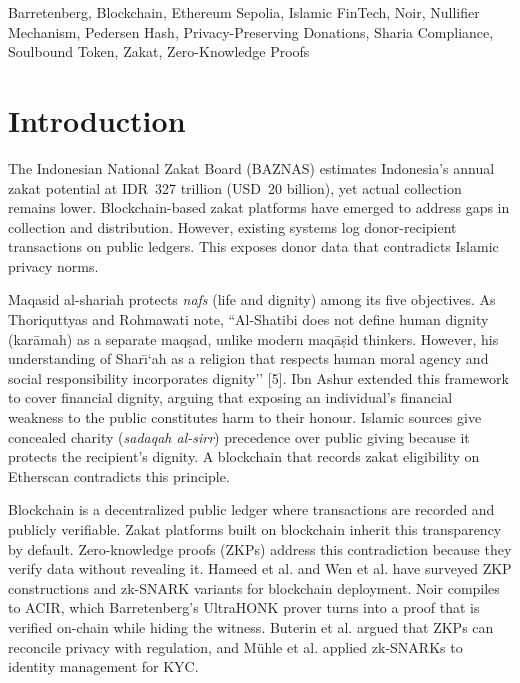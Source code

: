 \documentclass[conference]{IEEEtran}
\begin{document}
\begin{IEEEkeywords}
Barretenberg, Blockchain, Ethereum Sepolia, Islamic FinTech, Noir, Nullifier Mechanism, Pedersen Hash, Privacy-Preserving Donations, Sharia Compliance, Soulbound Token, Zakat, Zero-Knowledge Proofs
\end{IEEEkeywords}

\section{Introduction}

The Indonesian National Zakat Board (BAZNAS)\cite{b_baznas} estimates Indonesia's annual zakat potential at IDR~327 trillion (USD~20 billion), yet actual collection remains lower\cite{b_baznas}\cite{b_zakat_biblio}. Blockchain-based zakat platforms have emerged to address gaps in collection and distribution\cite{b_zakat_acm}\cite{b_zakat_malaysia}\cite{b_zakat_transparency}. However, existing systems log donor-recipient transactions on public ledgers\cite{b_zakat_acm}\cite{b_zakat_transparency}\cite{b_zakat_malaysia}. This exposes donor data that contradicts Islamic privacy norms\cite{b_maqasid_data}\cite{b_maqasid_privacy}.

Maqasid al-shariah protects \textit{nafs} (life and dignity) among its five objectives\cite{b_maqasid_data}\cite{b_maqasid_fintech}. As Thoriquttyas and Rohmawati note, ``Al-Shatibi does not define human dignity (kar\={a}mah) as a separate maq\d{s}ad, unlike modern maq\={a}\d{s}id thinkers. However, his understanding of Shar\={\i}`ah as a religion that respects human moral agency and social responsibility incorporates dignity'' [5]. Ibn Ashur extended this framework to cover financial dignity, arguing that exposing an individual's financial weakness to the public constitutes harm to their honour\cite{b_maqasid_privacy}. Islamic sources give concealed charity (\textit{sadaqah al-sirr}) precedence over public giving because it protects the recipient's dignity\cite{b_maqasid_data}\cite{b_maqasid_privacy}. A blockchain that records zakat eligibility on Etherscan contradicts this principle\cite{b_maqasid_blockchain}.

Blockchain is a decentralized public ledger where transactions are recorded and publicly verifiable\cite{b_zakat_acm}\cite{b_ziswaf_blockchain}. Zakat platforms built on blockchain inherit this transparency by default\cite{b_zakat_transparency}\cite{b_zakat_malaysia}. Zero-knowledge proofs (ZKPs) address this contradiction because they verify data without revealing it\cite{b_zkp_circuits}\cite{b_zkp_cacm}. Hameed et al.\cite{b_zkp_blockchain} and Wen et al.\cite{b_zkp_vuln} have surveyed ZKP constructions and zk-SNARK variants for blockchain deployment. Noir\cite{b_noir} compiles to ACIR, which Barretenberg's UltraHONK prover\cite{b_aztec} turns into a proof that is verified on-chain while hiding the witness\cite{b_zkp_financial}. Buterin et al.\cite{b_zkfi} argued that ZKPs can reconcile privacy with regulation, and M\"{u}hle et al.\cite{b_zkp_idm} applied zk-SNARKs to identity management for KYC.
\end{document}
